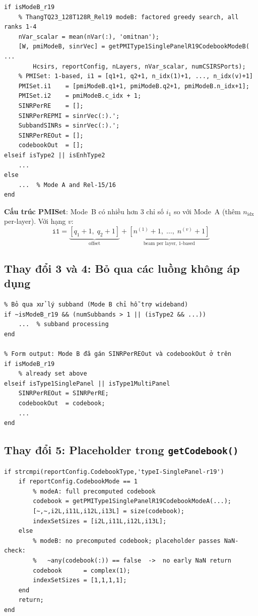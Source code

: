 \documentclass[11pt,a4paper]{article}
\begin{document}
\begin{lstlisting}
if isModeB_r19
    % ThangTQ23_128T128R_Rel19 modeB: factored greedy search, all ranks 1-4
    nVar_scalar = mean(nVar(:), 'omitnan');
    [W, pmiModeB, sinrVec] = getPMIType1SinglePanelR19CodebookModeB( ...
        Hcsirs, reportConfig, nLayers, nVar_scalar, numCSIRSPorts);
    % PMISet: 1-based, i1 = [q1+1, q2+1, n_idx(1)+1, ..., n_idx(v)+1]
    PMISet.i1    = [pmiModeB.q1+1, pmiModeB.q2+1, pmiModeB.n_idx+1];
    PMISet.i2    = pmiModeB.c_idx + 1;
    SINRPerRE    = [];
    SINRPerREPMI = sinrVec(:).';
    SubbandSINRs = sinrVec(:).';
    SINRPerREOut = [];
    codebookOut  = [];
elseif isType2 || isEnhType2
    ...
else
    ...  % Mode A and Rel-15/16
end
\end{lstlisting}

\noindent\textbf{Cấu trúc PMISet}: Mode~B có nhiều hơn 3 chỉ số $i_1$ so với Mode~A
(thêm $n_\text{idx}$ per-layer). Với hạng $v$:
\begin{equation}
  \texttt{i1} = \underbrace{[q_1+1,\; q_2+1]}_{\text{offset}} +
  \underbrace{[n^{(1)}+1,\;\ldots,\;n^{(v)}+1]}_{\text{beam per layer, 1-based}}
  \label{eq:pmiset_i1}
\end{equation}

\subsection{Thay đổi 3 và 4: Bỏ qua các luồng không áp dụng}

\begin{lstlisting}
% Bỏ qua xử lý subband (Mode B chỉ hỗ trợ wideband)
if ~isModeB_r19 && (numSubbands > 1 || (isType2 && ...))
    ...  % subband processing
end

% Form output: Mode B đã gán SINRPerREOut và codebookOut ở trên
if isModeB_r19
    % already set above
elseif isType1SinglePanel || isType1MultiPanel
    SINRPerREOut = SINRPerRE;
    codebookOut  = codebook;
    ...
end
\end{lstlisting}

\subsection{Thay đổi 5: Placeholder trong \texttt{getCodebook()}}

\begin{lstlisting}
if strcmpi(reportConfig.CodebookType,'typeI-SinglePanel-r19')
    if reportConfig.CodebookMode == 1
        % modeA: full precomputed codebook
        codebook = getPMIType1SinglePanelR19CodebookModeA(...);
        [~,~,i2L,i11L,i12L,i13L] = size(codebook);
        indexSetSizes = [i2L,i11L,i12L,i13L];
    else
        % modeB: no precomputed codebook; placeholder passes NaN-check:
        %   ~any(codebook(:)) == false  ->  no early NaN return
        codebook      = complex(1);
        indexSetSizes = [1,1,1,1];
    end
    return;
end
\end{lstlisting}
\end{document}
